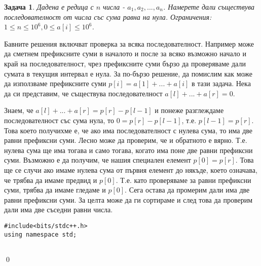 \documentclass[]{article}
\newtheorem{problem}{Задача}
\newenvironment{solution}{\noindent{\bf Решение.}\hspace*{1em}}{\qed\par}
\begin{document}
\begin{problem}
Дадена е редица с $n$ числа - $a_1,a_2,...,a_n$. Намерете дали съществува последователност от числа със сума равна на нула.\newline
Ограничения: $1\leq n\leq 10^6,0 \leq a[i]\leq 10^6$.
\end{problem}
\begin{solution}
Бавните решения включват проверка за всяка последователност. Например може да сметнем префиксните суми в началото и после за всяко възможно начало и край на последователност, чрез префиксните суми бързо да проверяваме дали сумата в текущия интервал е нула.\newline
За по-бързо решение, да помислим как може да използваме префиксните суми $p[i]=a[1]+...+a[i]$ в тази задача. Нека да си представим, че съществува последователност $a[l]+...+a[r]=0$.
\newline
{}
\newline\newline
{}
\newline\newline
Знаем, че $a[l]+...+a[r]=p[r]-p[l-1]$ и понеже разглеждаме последователност със сума нула, то $0=p[r]-p[l-1]$, т.е. $p[l-1]=p[r]$. Това което получихме е, че ако има последователност с нулева сума, то има две равни префиксни суми. Лесно може да проверим, че и обратното е вярно. Т.е. нулева сума ще има тогава и само тогава, когато има поне две равни префиксни суми.\newline
Възможно е да получим, че нашия специален елемент $p[0]=p[r]$. Това ще се случи ако имаме нулева сума от първия елемент до някъде, което означава, че трябва да имаме предвид и $p[0]$. Т.е. като проверяваме за равни префиксни суми, трябва да имаме гледаме и $p[0]$.\newline
Сега остава да промерим дали има две равни префиксни суми. За целта може да ги сортираме и след това да проверим дали има две съседни равни числа.
\begin{verbatim}
#include<bits/stdc++.h>
using namespace std;


\end{verbatim}
\end{solution}
\end{document}
